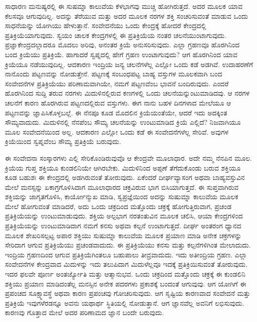 ಸಾಧಾರಣ ಮನುಷ್ಯರಲ್ಲಿ ಈ ಸುಷಮ್ನಾ ಕಾಲುವೆಯ ಕೆಳಭಾಗವು ಮುಚ್ಚಿ ಹೋಗಿರುತ್ತದೆ. ಅದರ ಮೂಲಕ ಯಾವ ಕೆಲಸವೂ ಆಗುವುದಿಲ್ಲ. ಅದನ್ನು ತೆರೆಯುವ ಮತ್ತು ಅದರ ಮೂಲಕ ನರಗಳ ಶಕ್ತಿ ಸಂಚರಿಸುವಂತೆ ಮಾಡುವ ಒಂದು ಸಾಧನೆಯನ್ನು ಯೋಗಿಯು ಹೇಳುತ್ತಾನೆ. ಸಂವೇದನೆಯು ಒಂದು ಕೇಂದ್ರಕ್ಕೆ ಹೋದರೆ ಕೇಂದ್ರದಲ್ಲಿ ಪ್ರತಿಕ್ರಿಯೆಯಾಗುವುದು. ಸ್ವಯಂ ಚಾಲಕ ಕೇಂದ್ರಗಳಲ್ಲಿ  ಈ ಪ್ರತಿಕ್ರಿಯೆಯ ನಂತರ ಚಲನೆಯುಂಟಾಗುವುದು. ಪ್ರಜ್ಞಾಕೇಂದ್ರದಲ್ಲಾದರೂ ಮೊದಲು ಅರಿವು, ಅನಂತರ ಕ್ರಿಯೆ ಅನುಸರಿಸುವುದು. ಎಲ್ಲಾ ಗ್ರಹಣವೂ ಹೊರಗಿನಿಂದ ಬಂದ ಕ್ರಿಯೆಯು ಪ್ರತಿಕ್ರಿಯೆ. ಹಾಗಾದರೆ ಸ್ವಪ್ನದಲ್ಲಿ ಹೇಗೆ ಗ್ರಹಣ ಉಂಟಾಗುವುದು? ಆಗ ಹೊರಗಿನಿಂದ ಯಾವ ಕ್ರಿಯೆಯೂ ನಡೆಯುವುದಿಲ್ಲ. ಆದಕಾರಣ ಇಂದ್ರಿಯ ಜನ್ಯ ಚಲನೆಗಳೆಲ್ಲ ಎಲ್ಲೋ ಒಂದು ಕಡೆ ಅಡಗಿವೆ. ಉದಾಹರಣೆಗೆ ನಾನೊಂದು ಪಟ್ಟಣವನ್ನು ನೋಡುತ್ತೇನೆ. ಪಟ್ಟಣಕ್ಕೆ ಸಂಬಂಧಪಟ್ಟ ಬಾಹ್ಯ ವಸ್ತುಗಳ ಮೂಲಕವಾಗಿ ಬಂದ ಸಂವೇದನೆಗಳ ಪ್ರತಿಕ್ರಿಯೆಯು ಪರಿಣಾಮವಾಗಿಯೇ, ನಮಗೆ ಪಟ್ಟಣವೆಂಬ ಭಾವನೆ ಬಂದಿರುವುದು. ಎಂದರೆ ಹೊರಗಿನಿಂದ ಸುದ್ದಿ ತರುವ ನರಗಳು ಮಿದುಳಿನಲ್ಲಿರುವ ಕಣಗಳಲ್ಲಿ ಒಂದು ಚಲನೆಯನ್ನುಂಟುಮಾಡಿದವು. ಆ ನರಗಳ ಚಲನೆಗೆ ಕಾರಣ ಹೊರಗಿರುವ ಪಟ್ಟಣದಲ್ಲಿರುವ ವಸ್ತುಗಳು. ಈಗ ನಾನು ಬಹಳ ದಿನಗಳಾದ ಮೇಲೆಯೂ ಆ ಪಟ್ಟಣವನ್ನು ಜ್ಞಾಪಿಸಿಕೊಳ್ಳಬಲ್ಲೆ. ಈ ನೆನಪೂ ಕೂಡ ಮೊದಲಿನ ಕ್ರಿಯೆಯಂತೆಯೇ, ಆದರೆ ಇದು ಅದಕ್ಕಿಂತ ಸೌಮ್ಯವಾದುದು. ಮಿದುಳಿನಲ್ಲಿ ನೆನಪೆಂಬ ಸೌಮ್ಯ ಚಲನೆಯನ್ನು ಉಂಟುಮಾಡಿದ ಕ್ರಿಯೆ ಎಲ್ಲಿದೆ? ನಿಜವಾಗಿಯೂ ಮೂಲ ಸಂವೇದನೆಯಿಂದ  ಅಲ್ಲ. ಆದಕಾರಣ ಎಲ್ಲೋ ಒಂದು ಕಡೆ ಈ ಸಂವೇದನೆಗಳೆಲ್ಲ ಸೇರಿವೆ. ಅವುಗಳ ಕ್ರಿಯೆಯಿಂದ ಸ್ವಪ್ನವೆಂಬ ಸೌಮ್ಯ ಪ್ರತಿಕ್ರಿಯೆ ಬರುವುದು. 

\newpage

ಈ ಸಂವೇದನಾ ಸಂಸ್ಕಾರಗಳು ಎಲ್ಲಿ ಸೇರಿಕೊಂಡಿರುವುವೊ ಆ ಕೇಂದ್ರವೇ ಮೂಲಾಧಾರ. ಅದೇ ನಮ್ಮ ನೆನಪಿನ ಮೂಲ. ಕ್ರಿಯೆಯ ಗುಪ್ತ ಶಕ್ತಿಯೂ ಕುಂಡಲಿನಿಯೇ ಆಗಿರಬೇಕು. ಮಿದುಳಿನಿಂದ ಅಪ್ಪಣೆ ತೆಗೆದುಕೊಂಡು ಬರುವ ಶಕ್ತಿಯೂ ಕೂಡ ಬಹುಶಃ ಈ ಕೇಂದ್ರದಲ್ಲಿ ಅಡಗಿರುವಂತೆ ತೋರುವುದು. ಏಕೆಂದರೆ ದೀರ್ಘವ್ಯಾಸಂಗ ಅಥವಾ ಬಾಹ್ಯವಸ್ತುವಿನ ಮೇಲೆ ಮನಸ್ಸನ್ನು ಏಕಾಗ್ರಗೊಳಿಸಿದಾಗ ಮೂಲಾಧಾರದ ಚಕ್ರವಿರುವ ಭಾಗ ಬಿಸಿಯಾಗುತ್ತದೆ. ಈ ಸುಪ್ತವಾಗಿರುವ ಶಕ್ತಿಯನ್ನು ಜಾಗೃತಗೊಳಿಸಿ, ಕಾರ್ಯೋನ್ಮುಖ ಮಾಡಿ, ಸ್ವಪ್ರಜ್ಞೆಯಿಂದ ಅದನ್ನು ಸುಷುಮ್ನಾ ಕಾಲುವೆಯ ಮೂಲಕ ಮೇಲೆ ಹೋಗುವಂತೆ ಮಾಡಿದರೆ, ಅದು ಒಂದು ಚಕ್ರದಿಂದ ಮತ್ತೊಂದು ಚಕ್ರಕ್ಕೆ ಹೋಗುತ್ತಿರುವಾಗ, ಪ್ರಚಂಡ ಪ್ರತಿಕ್ರಿಯೆಯನ್ನು ಉಂಟುಮಾಡುವುದು. ಶಕ್ತಿಯ ಅಲ್ಪಭಾಗ ನರತಂತುವಿನ ಮೂಲಕ ಚಲಿಸಿ, ಆಯಾ ಕೇಂದ್ರಗಳಿಂದ ಪ್ರತಿಕ್ರಿಯೆಯನ್ನು ಉಂಟುಮಾಡಿದಾಗ ನಮಗೆ ಕನಸು ಅಥವಾ ಕಲ್ಪನೆ ಉಂಟಾಗುತ್ತದೆ. ದೀರ್ಘ ಅಂತರಂಗ ಧ್ಯಾನದ ಮೂಲಕ ಶೇಖರಿಸಲ್ಪಟ್ಟ ಅಪಾರ ಶಕ್ತಿಯು ಸುಷುಮ್ನಾ ಕಾಲುವೆಯ ಮೂಲಕ ಪ್ರಯಾಣ ಮಾಡಿ ಅನೇಕ ಚಕ್ರಗಳನ್ನು ಸೇರಿದಾಗ ಆಗುವ ಪ್ರತಿಕ್ರಿಯೆಯು ಪ್ರಚಂಡವಾದುದು. ಈ ಪ್ರತಿಕ್ರಿಯೆಯು ಕನಸು ಮತ್ತು ಕಲ್ಪನೆಗಳಿಗಿಂತ ಮೇಲಾದುದು. ಇಂದ್ರಿಯ ಗ್ರಹಣದಿಂದ ಆಗುವ ಪ್ರತಿಕ್ರಿಯೆ\break ಗಿಂತಲೂ ಬಹುಪಾಲು ತೀವ್ರವಾದುದು. ಇದು ಅತೀಂದ್ರಿಯ ಗ್ರಹಣ. ಎಲ್ಲಾ ಸಂವೇದನೆಗಳ ಕೇಂದ್ರವಾದ ಮಿದುಳನ್ನು ಇದು ತಲುಪಿದಾಗ ಮಿದುಳೆಲ್ಲವೂ ಇದಕ್ಕೆ ಪ್ರತಿಕ್ರಿಯಿಸುವಂತೆ ತೋರುವುದು. ಇದರ ಫಲವೇ ಪೂರ್ಣ ಅಂತರ್ಜ್ಯೋತಿ ಮತ್ತು ಆತ್ಮಾನುಭವ. ಒಂದು ಚಕ್ರದಿಂದ ಮತ್ತೊಂದು ಚಕ್ರಕ್ಕೆ ಈ ಕುಂಡಲಿನಿ ಶಕ್ತಿಯು ಪ್ರಯಾಣ ಮಾಡಿದಂತೆಲ್ಲ ಮನಸ್ಸಿನ ಅನೇಕ ಪದರಗಳು ಪ್ರಕಾಶಕ್ಕೆ ಬಂದಂತೆ ಆಗುವುವು. ಆಗ ಯೋಗಿಗೆ ಈ ಪ್ರಪಂಚದ ಸೂಕ್ಷ್ಮಾವಸ್ಥೆ ಅಥವಾ ಕಾರಣ ಪ್ರಪಂಚವು ಗೋಚರಿಸುವುದು. ಆಗ ಸೃಷ್ಟಿಯ ಕಾರಣವಾದ ಸಂವೇದನೆ ಮತ್ತು ಪ್ರತಿಕ್ರಿಯೆ ಇವುಗಳೆರಡನ್ನೂ ಅವನು ಯಥಾರ್ಥ ಸ್ಥಿತಿಯಲ್ಲಿ ನೋಡುತ್ತಾನೆ. ಆಗ ಜ್ಞಾನವೆಲ್ಲ ಅವನಿಗೆ ಲಭಿಸುವುದು. ಕಾರಣವು ಗೊತ್ತಾದ ಮೇಲೆ ಅದರ ಪರಿಣಾಮದ ಜ್ಞಾನ ಬಂದೇ ಬರುವುದು. 

